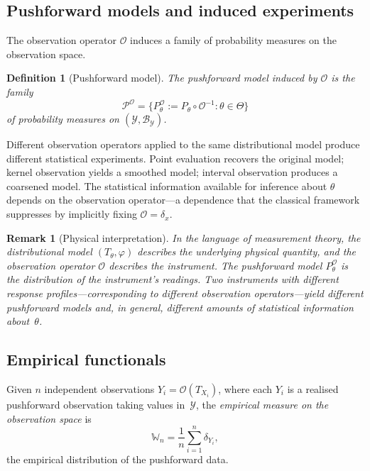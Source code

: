 \documentclass[11pt,a4paper]{article}
\newtheorem{definition}[theorem]{Definition}
\newtheorem{remark}[theorem]{Remark}
\begin{document}
\subsection{Pushforward models and induced experiments}\label{subsec:pushforward}

The observation operator $\mathcal O$ induces a family of probability
measures on the observation space.

\begin{definition}[Pushforward model]\label{def:pushforward}
The \emph{pushforward model} induced by $\mathcal O$ is the family
\[
\mathcal P^{\mathcal O}
= \{P_\theta^{\mathcal O} := P_\theta \circ \mathcal O^{-1}
   : \theta \in \Theta\}
\]
of probability measures on $(\mathcal Y, \mathcal B_{\mathcal Y})$.
\end{definition}

Different observation operators applied to the same distributional model
produce different statistical experiments.  Point evaluation recovers the
original model; kernel observation yields a smoothed model; interval
observation produces a coarsened model.  The statistical information
available for inference about $\theta$ depends on the observation
operator---a dependence that the classical framework suppresses by implicitly
fixing $\mathcal O = \delta_x$.

\begin{remark}[Physical interpretation]\label{rem:physical}
In the language of measurement theory, the distributional model
$(T_\theta, \varphi)$ describes the underlying physical quantity, and the
observation operator $\mathcal O$ describes the instrument.  The
pushforward model $P_\theta^{\mathcal O}$ is the distribution of the
instrument's readings.  Two instruments with different response
profiles---corresponding to different observation operators---yield different
pushforward models and, in general, different amounts of statistical
information about~$\theta$.
\end{remark}

\subsection{Empirical functionals}\label{subsec:empirical}

Given $n$ independent observations $Y_i = \mathcal O(T_{X_i})$, where each
$Y_i$ is a realised pushforward observation taking values in~$\mathcal Y$,
the \emph{empirical measure on the observation space} is
\[
\mathbb W_n
= \frac{1}{n} \sum_{i=1}^n \delta_{Y_i},
\]
the empirical distribution of the pushforward data.
\end{document}
